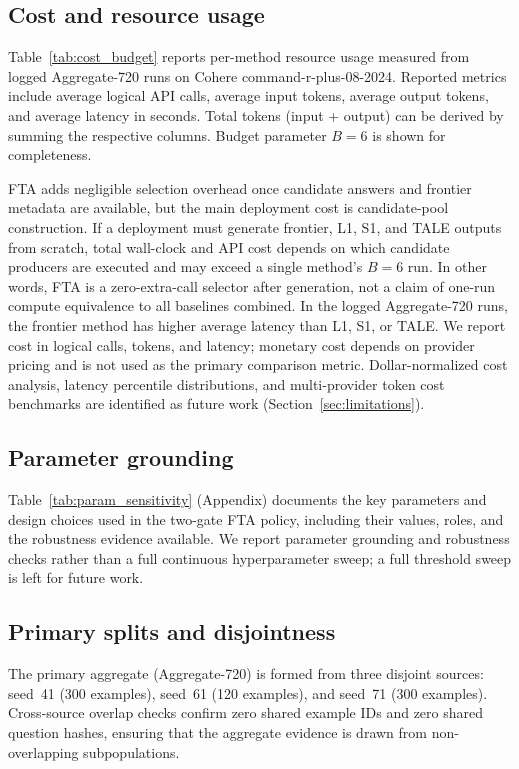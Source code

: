 \documentclass[smallcondensed]{svjour3}
\begin{document}
\subsection{Cost and resource usage}
\label{sec:cost}

Table~\ref{tab:cost_budget} reports per-method resource usage measured from logged Aggregate-720 runs on Cohere command-r-plus-08-2024. Reported metrics include average logical API calls, average input tokens, average output tokens, and average latency in seconds.  Total tokens (input + output) can be derived by summing the respective columns.  Budget parameter $B = 6$ is shown for completeness.

FTA adds negligible selection overhead once candidate answers and frontier
metadata are available, but the main deployment cost is candidate-pool construction.
If a deployment must generate frontier, L1, S1, and TALE outputs from scratch, total
wall-clock and API cost depends on which candidate producers are executed and may
exceed a single method's $B=6$ run. In other words, FTA is a zero-extra-call selector
after generation, not a claim of one-run compute equivalence to all baselines combined.
In the logged Aggregate-720 runs, the frontier
method has higher average latency than L1, S1, or TALE.
We report cost in logical calls, tokens, and latency; monetary cost depends on provider pricing and is not used as the primary comparison metric.  Dollar-normalized cost analysis, latency percentile distributions, and multi-provider token cost benchmarks are identified as future work (Section~\ref{sec:limitations}).

\subsection{Parameter grounding}
\label{sec:param_grounding}

Table~\ref{tab:param_sensitivity} (Appendix) documents the key parameters and design choices used in the two-gate FTA policy, including their values, roles, and the robustness evidence available.  We report parameter grounding and robustness checks rather than a full continuous hyperparameter sweep; a full threshold sweep is left for future work.

\subsection{Primary splits and disjointness}
The primary aggregate (Aggregate-720) is formed from three disjoint sources: seed~41 (300 examples), seed~61 (120 examples), and seed~71 (300 examples).  Cross-source overlap checks confirm zero shared example IDs and zero shared question hashes, ensuring that the aggregate evidence is drawn from non-overlapping subpopulations.
\end{document}
